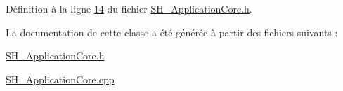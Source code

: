Définition à la ligne \hyperlink{SH__ApplicationCore_8h_source_l00014}{14} du fichier \hyperlink{SH__ApplicationCore_8h_source}{S\-H\-\_\-\-Application\-Core.\-h}.



La documentation de cette classe a été générée à partir des fichiers suivants \-:\begin{DoxyCompactItemize}
\item 
\hyperlink{SH__ApplicationCore_8h}{S\-H\-\_\-\-Application\-Core.\-h}\item 
\hyperlink{SH__ApplicationCore_8cpp}{S\-H\-\_\-\-Application\-Core.\-cpp}\end{DoxyCompactItemize}
